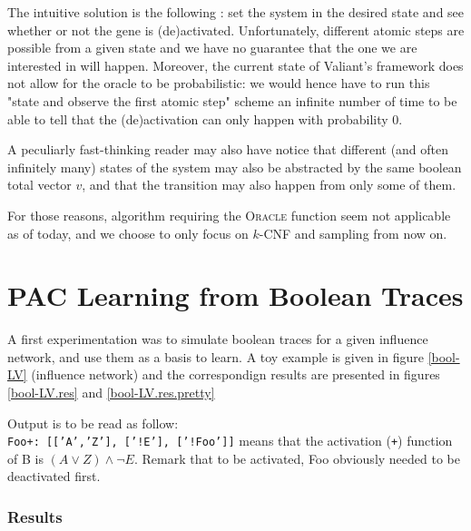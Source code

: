 \documentclass{llncs}
\begin{document}
The intuitive solution is the following : set the system in the desired state and see whether or not the gene is (de)activated. Unfortunately, different atomic steps are possible from a given state and we have no guarantee that the one we are interested in will happen. Moreover, the current state of Valiant's framework does not allow for the oracle to be probabilistic: we would hence have to run this "state and observe the first atomic step" scheme an infinite number of time to be able to tell that the (de)activation can only happen with probability 0.

A peculiarly fast-thinking reader may also have notice that different (and often infinitely many) states of the system may also be abstracted by the same boolean total vector $v$, and that the transition may also happen from only some of them.

For those reasons, algorithm requiring the \textsc{Oracle} function seem not applicable as of today, and we choose to only focus on $k$-CNF and sampling from now on.


\section{PAC Learning from Boolean Traces}

A first experimentation was to simulate boolean traces for a given influence network, and use them as a basis to learn. A toy example is given in figure \ref{bool-LV} (influence network) and the correspondign results are presented in figures \ref{bool-LV.res} and \ref{bool-LV.res.pretty}

Output is to be read as follow:\\
\texttt{Foo+:~[['A','Z'],~['!E'],~['!Foo']]} means that the activation (\texttt{+}) function of B is $(A \vee Z)\wedge\neg E$. Remark that to be activated, Foo obviously needed to be deactivated first.

\subsubsection{Results}
\end{document}
